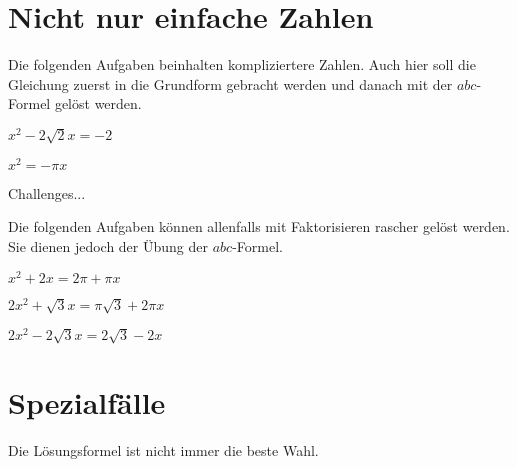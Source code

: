 \section{Nicht nur einfache Zahlen}
Die folgenden Aufgaben beinhalten kompliziertere Zahlen. Auch hier
soll die Gleichung zuerst in die Grundform gebracht werden und danach
mit der $abc$-Formel gelöst werden.

\begin{bbwAufgabenBlock}
\item $ x^2 - 2\sqrt{2}x = -2$

\item $ x^2 = -\pi x $

Challenges...

Die folgenden Aufgaben können allenfalls mit Faktorisieren rascher
gelöst werden. Sie dienen jedoch der Übung der $abc$-Formel.

\item $ x^2 + 2x = 2\pi + \pi x$

\item $ 2x^2 +\sqrt{3} x= \pi \sqrt{3} + 2\pi x$

\item $ 2x^2 -2\sqrt{3} x = 2\sqrt{3}- 2x $

\end{bbwAufgabenBlock}
\newpage
\section{Spezialfälle}
Die Lösungsformel ist nicht immer die beste Wahl.

